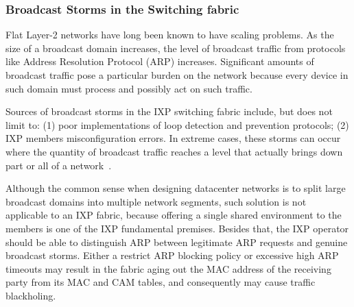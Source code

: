 \documentclass[12pt]{article}
\begin{document}
\subsubsection{Broadcast Storms in the Switching fabric}
\label{subsubsec:broadcast_storm}

Flat Layer-2 networks have long been known to have scaling problems. As the size of a broadcast domain increases, the level of broadcast traffic from protocols like Address Resolution Protocol (ARP) increases. Significant amounts of broadcast traffic pose a particular burden on the network because every device in such domain must process and possibly act on such traffic. 

Sources of broadcast storms in the IXP switching fabric include, but does not limit to: (1) poor implementations of loop detection and prevention protocols; (2) IXP members misconfiguration errors. In extreme cases, these storms can occur where the quantity of broadcast traffic reaches a level that actually brings down part or all of a network~\cite{rfc6820}. 



Although the common sense when designing datacenter networks is to split large broadcast domains into multiple network segments, such solution is not applicable to an IXP fabric, because offering a single shared environment to the members is one of the IXP fundamental premises. Besides that, the IXP operator should be able to distinguish ARP between legitimate ARP requests and genuine broadcast storms. Either  a restrict ARP blocking policy or excessive high ARP timeouts may result in the fabric aging out the MAC address of the receiving party from its MAC and CAM tables, and consequently may cause traffic blackholing.
\end{document}
